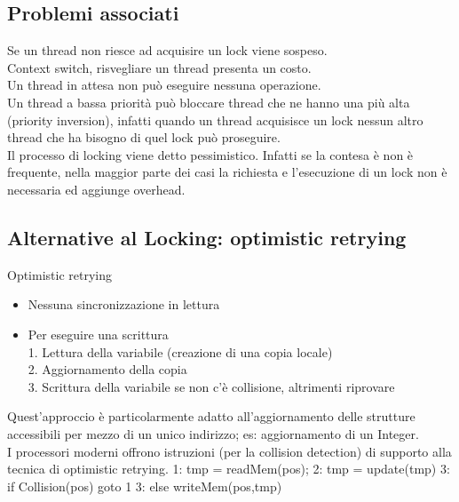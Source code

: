 \subsection{Problemi associati}
Se un thread non riesce ad acquisire un lock viene sospeso.
\\Context switch, risvegliare un thread presenta un costo.
\\Un thread in attesa non può eseguire nessuna operazione.
\\Un thread a bassa priorità può bloccare thread che ne hanno una più alta (priority inversion), infatti quando un thread acquisisce un lock nessun altro thread che ha bisogno di quel lock può proseguire.
\\Il processo di locking viene detto pessimistico. Infatti se la contesa è non è frequente, nella maggior parte dei casi la richiesta e l'esecuzione di un lock non è necessaria ed aggiunge overhead. 

\subsection{Alternative al Locking: optimistic retrying}
Optimistic retrying
\begin{itemize}
    \item Nessuna sincronizzazione in lettura
    \item Per eseguire una scrittura
    \\1. Lettura della variabile (creazione di una copia locale)
    \\2. Aggiornamento della copia
    \\3. Scrittura della variabile se non c'è collisione, altrimenti riprovare
\end{itemize}
Quest'approccio è particolarmente adatto all'aggiornamento delle strutture accessibili per mezzo di un unico indirizzo; es: aggiornamento di un Integer.
\\I processori moderni offrono istruzioni (per la collision detection) di supporto alla tecnica di optimistic retrying.
1: tmp = readMem(pos);
2: tmp = update(tmp)
3: if Collision(pos) goto 1
3: else writeMem(pos,tmp)

